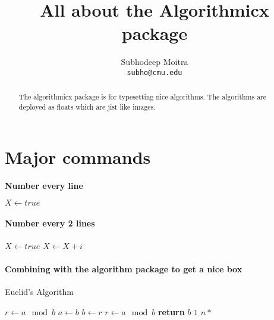 \documentclass{article}
\begin{document}
\author{Subhodeep Moitra \\ {\tt subho@cmu.edu}}
\title{All about the Algorithmicx package}
\maketitle

\begin{abstract}
The algorithmicx package is for typesetting nice algorithms. The algorithms are deployed as floats which are jist like images. 
\end{abstract}

\section{Major commands}

\textbf{Number every line}
\begin{algorithmic}[1]
	\State $X \gets true$
\EndIf
\end{algorithmic}


\paragraph{Number every 2 lines}
\begin{algorithmic}[2]
	\State $X \gets true$
\EndIf
{}
	\State $X \gets X + i$
\EndFor
\end{algorithmic}

\paragraph{Combining with the algorithm package to get a nice box}
\begin{algorithm}
\caption{Euclid's Algorithm} \label{algo:euclid}
\begin{algorithmic}[1]
	\State $r \gets a \mod b$
	 
		\State $a \gets b$
		\State $b \gets r$
		\State $r \gets a \mod b$
	\EndWhile
	\State \textbf{return} $b$ 
\EndProcedure
\Statex {}
		 $1$
	\Else
		 $n*$
	\EndIf
\EndProcedure
\end{algorithmic}
\end{algorithm}
\end{document}

